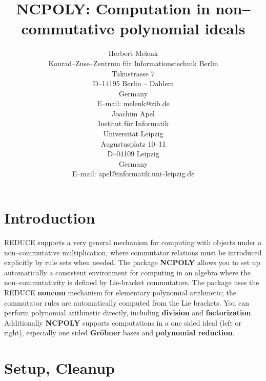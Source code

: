 \title{NCPOLY: Computation in non--commutative polynomial ideals}
\date{}
\author{
Herbert Melenk\\[0.05in]
Konrad--Zuse--Zentrum f\"ur Informationstechnik Berlin \\
Takustrasse 7 \\
D--14195 Berlin -- Dahlem \\
Germany \\[0.05in]
E--mail: melenk@zib.de \\[0.1in]
Joachim Apel\\[0.05in]
Institut f\"ur Informatik \\[0.05in]
Universit\"at Leipzig \\[0.05in]
Augustusplatz 10--11\\[0.05in]
D--04109 Leipzig \\[0.05in]
Germany \\[0.05in]
E--mail: apel@informatik.uni--leipzig.de \\[0.05in]
}


\maketitle

\section{Introduction}

{\small REDUCE} supports a very general mechanism for computing
with objects under a non--commutative multiplication, where
commutator relations must be introduced explicitly by rule
sets when needed. The package {\bf NCPOLY} allows you to
set up automatically a consistent environment for computing in an algebra
where the non--commutativity is defined by Lie-bracket commutators.
The package uses the {\small REDUCE} {\bf noncom}
mechanism for elementary polynomial arithmetic; the commutator
rules are automatically computed from the Lie brackets.
You can perform polynomial arithmetic directly, including
{\bf division} and {\bf factorization}.
Additionally {\bf NCPOLY} supports computations in a one sided ideal (left or right),
especially one sided {\bf Gr\"obner} bases and {\bf polynomial reduction}.

\section{Setup, Cleanup}

